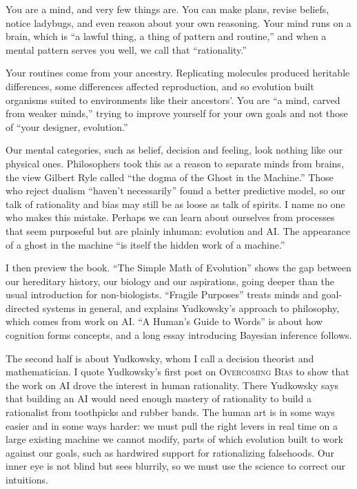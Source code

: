 
You are a mind, and very few things are. You can make plans, revise beliefs, notice ladybugs, and even reason about your own reasoning. Your mind runs on a brain, which is ``a lawful thing, a thing of pattern and routine,'' and when a mental pattern serves you well, we call that ``rationality.''

Your routines come from your ancestry. Replicating molecules produced heritable differences, some differences affected reproduction, and so evolution built organisms suited to environments like their ancestors'. You are ``a mind, carved from weaker minds,'' trying to improve yourself for your own goals and not those of ``your designer, evolution.''

Our mental categories, such as belief, decision and feeling, look nothing like our physical ones. Philosophers took this as a reason to separate minds from brains, the view Gilbert Ryle called ``the dogma of the Ghost in the Machine.''  Those who reject dualism ``haven't necessarily'' found a better predictive model, so our talk of rationality and bias may still be as loose as talk of spirits. I name no one who makes this mistake. Perhaps we can learn about ourselves from processes that seem purposeful but are plainly inhuman: evolution and AI. The appearance of a ghost in the machine ``is itself the hidden work of a machine.''

I then preview the book. ``The Simple Math of Evolution'' shows the gap between our hereditary history, our biology and our aspirations, going deeper than the usual introduction for non-biologists. ``Fragile Purposes'' treats minds and goal-directed systems in general, and explains Yudkowsky's approach to philosophy, which comes from work on AI. ``A Human's Guide to Words'' is about how cognition forms concepts, and a long essay introducing Bayesian inference follows.

The second half is about Yudkowsky, whom I call a decision theorist and mathematician. I quote Yudkowsky's first post on \textsc{Overcoming Bias} to show that the work on AI drove the interest in human rationality. There Yudkowsky says that building an AI would need enough mastery of rationality to build a rationalist from toothpicks and rubber bands. The human art is in some ways easier and in some ways harder: we must pull the right levers in real time on a large existing machine we cannot modify, parts of which evolution built to work against our goals, such as hardwired support for rationalizing falsehoods. Our inner eye is not blind but sees blurrily, so we must use the science to correct our intuitions.

